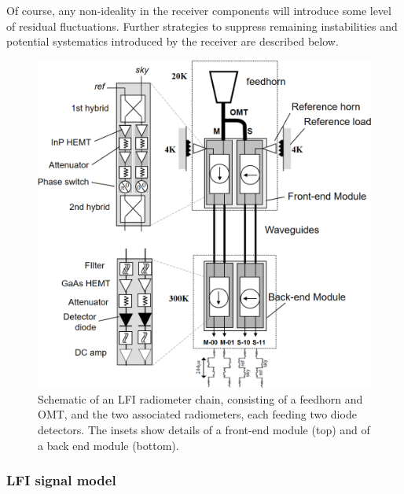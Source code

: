 \documentclass[twocolumn]{aa}
\begin{document}
Of course, any non-ideality in the receiver components will introduce
some level of residual fluctuations. Further strategies to suppress
remaining instabilities and potential systematics introduced by the
receiver are described below.




\begin{figure}[t]
	\center
	\includegraphics[width=\linewidth]{figs/RADIOMETER-SCHEME.png}
	\caption{Schematic of an LFI radiometer chain, consisting of a feedhorn and OMT, and the two associated radiometers, each feeding two diode detectors. The insets show details of a front-end module (top) and of a back end module (bottom). }
	\label{fig:RADIOMETER-SCHEME}
\end{figure}


\subsubsection{LFI signal model}
\label{sec:lfi_signal_model}
\end{document}
